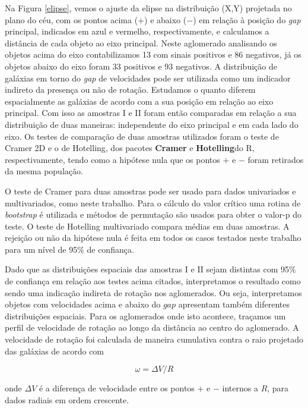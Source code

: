 Na Figura \ref{elipse}, vemos o ajuste da elipse na distribuição (X,Y) projetada no plano do céu, com os pontos acima ($+$) e abaixo ($-$) em relação à posição do \textit{gap} principal, indicados em azul e vermelho, respectivamente, e calculamos a distância de cada objeto ao eixo principal. Neste aglomerado analisando os objetos acima do eixo contabilizamos 13 com sinais positivos e 86 negativos, já os objetos abaixo do eixo foram 33 positivos e 93 negativos. A distribuição de galáxias em torno do \textit{gap} de velocidades pode ser utilizada como um indicador indireto da presença ou não de rotação. Estudamos o quanto diferem espacialmente as galáxias de acordo com a sua posição em relação ao eixo principal. Com isso as amostras I e II foram então comparadas em relação a sua distribuição de duas maneiras: independente do eixo principal e em cada lado do eixo. Os testes de comparação de duas amostras utilizados foram o teste de Cramer 2D e o de Hotelling, dos pacotes \textbf{ Cramer} e \textbf{ Hotelling}do R, respectivamente, tendo como a hipótese nula que os pontos $+$ e $-$ foram retirados da mesma população. 

O teste de Cramer para duas amostras pode ser usado para dados univariados e multivariados, como neste trabalho. Para o cálculo do valor crítico uma rotina de \textit{bootstrap} é utilizada e métodos de permutação são usados para obter o valor-p do teste. O teste de Hotelling multivariado compara médias em duas amostras. A rejeição ou não da hipótese nula é feita em todos os casos testados neste trabalho para um nível de 95\% de confiança. 

Dado que as distribuições espaciais das amostras  I e II sejam distintas com 95\% de confiança em relação aos testes acima citados, interpretamos o resultado como sendo uma indicação indireta de rotação nos aglomerados. Ou seja, interpretamos objetos com velocidades acima e abaixo do $gap$ apresentam também
diferentes distribuições espaciais.
Para os aglomerados onde isto acontece, traçamos um perfil de velocidade de rotação ao longo da distância ao centro do aglomerado. A velocidade de rotação foi calculada de maneira cumulativa contra o raio projetado das galáxias de acordo com

\begin{equation}
\omega= \Delta V/R
\label{eq:eq10}
\end{equation}

\noindent onde $\Delta V$ é a diferença de velocidade entre os pontos $+$ e $-$ internos a $R$, para dados radiais em ordem crescente.

